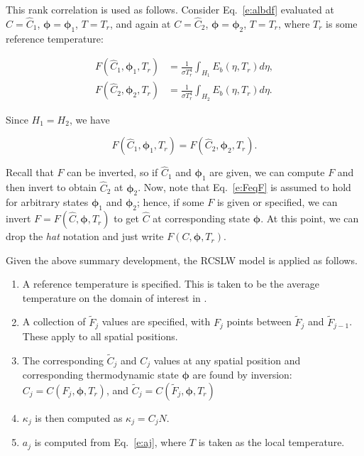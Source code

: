 \documentclass[preprint,12pt, a4paper]{elsarticle}
\newcommand{\BS}{\boldsymbol}
\begin{document}
This rank correlation is used as follows. Consider Eq.~\ref{e:albdf} evaluated at $C=\hat{C}_1$, $\BS{\phi}=\BS{\phi}_1$, $T=T_r$, and again at
$C=\hat{C}_2$, $\BS{\phi}=\BS{\phi}_2$, $T=T_r$, where $T_r$ is some reference temperature:
%
\begin{linenomath}
    \begin{align} \label{e:albdf2}
        F(\hat{C}_1,\BS{\phi}_1,T_r) &= \frac{1}{\sigma T_r^4}\int_{H_1}E_b(\eta,T_r)d\eta, \\
        F(\hat{C}_2,\BS{\phi}_2,T_r) &= \frac{1}{\sigma T_r^4}\int_{H_2}E_b(\eta,T_r)d\eta.
    \end{align}
\end{linenomath}
%
Since $H_1=H_2$, we have 
%
\begin{linenomath}
    \begin{equation}\label{e:FeqF}
    F(\hat{C}_1,\BS{\phi}_1,T_r)=F(\hat{C}_2,\BS{\phi}_2,T_r).
\end{equation}
\end{linenomath}
%
Recall that $F$ can be inverted, so if $\hat{C}_1$ and $\BS{\phi}_1$ are given, we can compute $F$ and then invert to obtain $\hat{C}_2$ at $\BS{\phi}_2$. Now, note that Eq.~\ref{e:FeqF} is assumed to hold for arbitrary states $\BS{\phi}_1$ and $\BS{\phi}_2$; hence, if some $F$ is given or specified, we can invert $F=F(\hat{C},\BS{\phi},T_r)$ to get $\hat{C}$ at corresponding state $\BS{\phi}$. At this point, we can drop the \emph{hat} notation and just write $F(C,\BS{\phi},T_r)$.

Given the above summary development, the RCSLW model is applied as follows. 
%
\begin{enumerate}
    \item A reference temperature is specified. This is taken to be the average temperature on the domain of interest in \cite{Solovjov_2001}.
    \item A collection of $\tilde{F}_j$ values are specified, with $F_j$ points between $\tilde{F}_j$ and $\tilde{F}_{j-1}$. These apply to all spatial positions. 
    \item The corresponding $\tilde{C}_j$ and $C_j$ values at any spatial position and corresponding thermodynamic state $\BS{\phi}$ are found by inversion: $C_j = C(F_j,\BS{\phi},T_r)$, and $\tilde{C}_j = C(\tilde{F}_j,\BS{\phi},T_r)$
    \item $\kappa_j$ is then computed as $\kappa_j=C_jN$. 
    \item $a_j$ is computed from Eq.~\ref{e:aj}, where $T$ is taken as the local temperature.
\end{enumerate}
%
\end{document}
